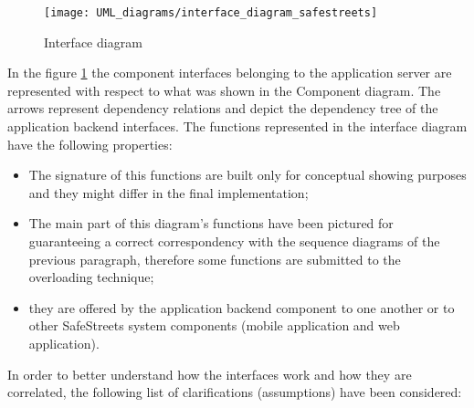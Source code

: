 \begin{figure}[H]
    \centering
    \texttt{[image: UML\_diagrams/interface\_diagram\_safestreets]}
    \caption{Interface diagram}
    \label{fig:interface_diagram}
\end{figure}
In the figure \ref{fig:interface_diagram} the component interfaces belonging to the application server are represented with respect to what was shown in the Component diagram. The arrows represent dependency relations and depict the dependency tree of the application backend interfaces. 
The functions represented in the interface diagram have the following properties:
\begin{itemize}
    \item The signature of this functions are built only for conceptual showing purposes and they might differ in the final implementation;
    \item The main part of this diagram's functions have been pictured for guaranteeing a correct correspondency with the sequence diagrams of the previous paragraph, therefore some functions are submitted to the overloading technique;
    \item they are offered by the application backend component to one another or to other SafeStreets system components (mobile application and web application).
\end{itemize} 
In order to better understand how the interfaces work and how they are correlated, the following list of clarifications (assumptions) have been considered:
